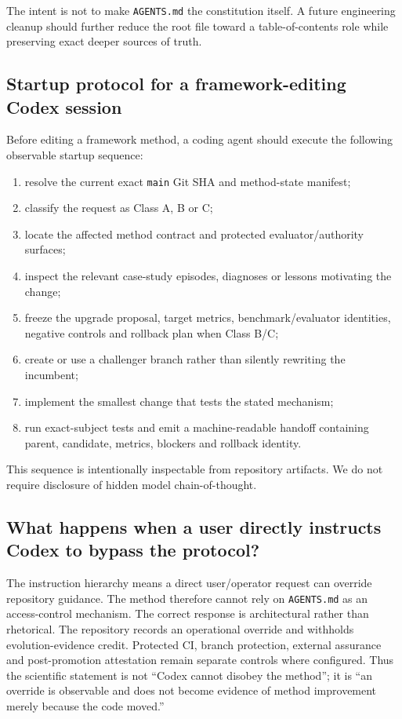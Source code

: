 The intent is not to make \texttt{AGENTS.md} the constitution itself. A future engineering cleanup should further reduce the root file toward a table-of-contents role while preserving exact deeper sources of truth.

\subsection{Startup protocol for a framework-editing Codex session}

Before editing a framework method, a coding agent should execute the following observable startup sequence:

\begin{enumerate}[leftmargin=*]
\item resolve the current exact \texttt{main} Git SHA and method-state manifest;
\item classify the request as Class A, B or C;
\item locate the affected method contract and protected evaluator/authority surfaces;
\item inspect the relevant case-study episodes, diagnoses or lessons motivating the change;
\item freeze the upgrade proposal, target metrics, benchmark/evaluator identities, negative controls and rollback plan when Class B/C;
\item create or use a challenger branch rather than silently rewriting the incumbent;
\item implement the smallest change that tests the stated mechanism;
\item run exact-subject tests and emit a machine-readable handoff containing parent, candidate, metrics, blockers and rollback identity.
\end{enumerate}

This sequence is intentionally inspectable from repository artifacts. We do not require disclosure of hidden model chain-of-thought.

\subsection{What happens when a user directly instructs Codex to bypass the protocol?}

The instruction hierarchy means a direct user/operator request can override repository guidance. The method therefore cannot rely on \texttt{AGENTS.md} as an access-control mechanism. The correct response is architectural rather than rhetorical. The repository records an operational override and withholds evolution-evidence credit. Protected CI, branch protection, external assurance and post-promotion attestation remain separate controls where configured. Thus the scientific statement is not ``Codex cannot disobey the method''; it is ``an override is observable and does not become evidence of method improvement merely because the code moved.''


